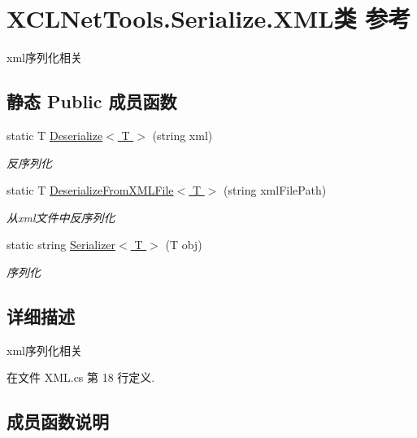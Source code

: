 \hypertarget{class_x_c_l_net_tools_1_1_serialize_1_1_x_m_l}{}\section{X\+C\+L\+Net\+Tools.\+Serialize.\+X\+M\+L类 参考}
\label{class_x_c_l_net_tools_1_1_serialize_1_1_x_m_l}


xml序列化相关  


\subsection*{静态 Public 成员函数}
\begin{DoxyCompactItemize}
\item 
static T \hyperlink{class_x_c_l_net_tools_1_1_serialize_1_1_x_m_l_a10f494104b432660b2cbfbd686425ff9}{Deserialize$<$ T $>$} (string xml)
\begin{DoxyCompactList}\small\item\em 反序列化 \end{DoxyCompactList}\item 
static T \hyperlink{class_x_c_l_net_tools_1_1_serialize_1_1_x_m_l_afdebd810bc96d095cab8ccdf8aaca684}{Deserialize\+From\+X\+M\+L\+File$<$ T $>$} (string xml\+File\+Path)
\begin{DoxyCompactList}\small\item\em 从xml文件中反序列化 \end{DoxyCompactList}\item 
static string \hyperlink{class_x_c_l_net_tools_1_1_serialize_1_1_x_m_l_a9540436b849eff236f8353cad8b20658}{Serializer$<$ T $>$} (T obj)
\begin{DoxyCompactList}\small\item\em 序列化 \end{DoxyCompactList}\end{DoxyCompactItemize}


\subsection{详细描述}
xml序列化相关 



在文件 X\+M\+L.\+cs 第 18 行定义.



\subsection{成员函数说明}
\mbox{\label{class_x_c_l_net_tools_1_1_serialize_1_1_x_m_l_a10f494104b432660b2cbfbd686425ff9}} 
